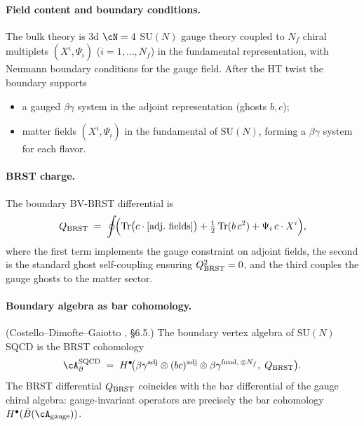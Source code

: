 \paragraph{Field content and boundary conditions.}
The bulk theory is $3$d $\cN=4$ $\mathrm{SU}(N)$ gauge theory coupled to $N_f$ chiral multiplets $(X^i, \Psi_i)$ ($i = 1, \ldots, N_f$) in the fundamental representation, with Neumann boundary conditions for the gauge field. After the HT twist the boundary supports
\begin{itemize}
\item a gauged $\beta\gamma$ system in the adjoint representation (ghosts $b, c$);
\item matter fields $(X^i, \Psi_i)$ in the fundamental of $\mathrm{SU}(N)$, forming a $\beta\gamma$ system for each flavor.
\end{itemize}

\paragraph{BRST charge.}
The boundary BV-BRST differential is
\begin{equation}\label{eq:sqcd-brst}
 Q_{\mathrm{BRST}} \;=\; \oint\!\Bigl(
 \operatorname{Tr}\bigl(c \cdot [\text{adj.\ fields}]\bigr)
 + \tfrac{1}{2}\operatorname{Tr}(b\, c^2)
 + \Psi_i\, c \cdot X^i
 \Bigr),
\end{equation}
where the first term implements the gauge constraint on adjoint fields,
the second is the standard ghost self-coupling ensuring $Q_{\mathrm{BRST}}^2 = 0$,
and the third couples the gauge ghosts to the matter sector.

\paragraph{Boundary algebra as bar cohomology.}
\begin{proposition}
\label{prop:sqcd-boundary-algebra}
\textup{(Costello--Dimofte--Gaiotto \cite{CDG2023}, \S6.5.)}
The boundary vertex algebra of $\mathrm{SU}(N)$ SQCD is the BRST
cohomology
\[
 \cA_\partial^{\mathrm{SQCD}}
 \;=\;
 H^\bullet\!\bigl(
 \beta\gamma^{\mathrm{adj}} \otimes (bc)^{\mathrm{adj}}
 \otimes \beta\gamma^{\mathrm{fund},\, \otimes N_f},\;
 \QBRST
 \bigr).
\]
The BRST differential $Q_{\mathrm{BRST}}$ coincides with the bar differential of
the gauge chiral algebra: gauge-invariant operators are precisely the
bar cohomology $H^\bullet(\bar{B}(\cA_{\mathrm{gauge}}))$.
\end{proposition}


